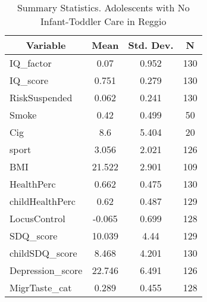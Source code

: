 
\begin{table}[htbp]\centering \caption{Summary Statistics. Adolescents with No Infant-Toddler Care in Reggio \label{bothAdolasiloNoneReggio}}
\begin{tabular}{l c c  c}\hline\hline
\multicolumn{1}{c}{\textbf{Variable}} & \textbf{Mean}
 & \textbf{Std. Dev.} & \textbf{N}\\ \hline
IQ\_factor & 0.07 & 0.952  & 130\\
IQ\_score & 0.751 & 0.279  & 130\\
RiskSuspended & 0.062 & 0.241  & 130\\
Smoke & 0.42 & 0.499  & 50\\
Cig & 8.6 & 5.404  & 20\\
sport & 3.056 & 2.021  & 126\\
BMI & 21.522 & 2.901  & 109\\
HealthPerc & 0.662 & 0.475  & 130\\
childHealthPerc & 0.62 & 0.487  & 129\\
LocusControl & -0.065 & 0.699  & 128\\
SDQ\_score & 10.039 & 4.44  & 129\\
childSDQ\_score & 8.468 & 4.201  & 130\\
Depression\_score & 22.746 & 6.491  & 126\\
MigrTaste\_cat & 0.289 & 0.455  & 128\\
\hline\end{tabular}
\end{table}
